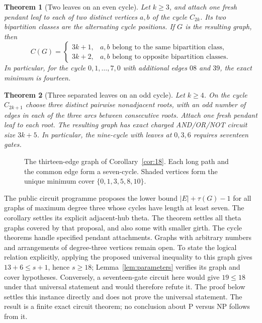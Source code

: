 \documentclass[11pt]{article}
\newtheorem{theorem}{Theorem}[section]
\theoremstyle{definition}
\theoremstyle{remark}
\begin{document}
\begin{theorem}[Two leaves on an even cycle]\label{thm:leaves}
Let $k\ge3$, and attach one fresh pendant leaf to each of two distinct
vertices $a,b$ of the cycle $C_{2k}$. Its two bipartition classes are the
alternating cycle positions. If $G$ is the resulting graph, then
\[
C(G)=
\begin{cases}
3k+1,&a,b\text{ belong to the same bipartition class},\\
3k+2,&a,b\text{ belong to opposite bipartition classes}.
\end{cases}
\]
In particular, for the cycle $0,1,\ldots,7,0$ with additional edges
$08$ and $39$, the exact minimum is fourteen.
\end{theorem}

\begin{theorem}[Three separated leaves on an odd cycle]\label{thm:threeleaves}
Let $k\ge4$. On the cycle $C_{2k+1}$ choose three distinct pairwise
nonadjacent roots, with an odd number of edges in each of the three arcs
between consecutive roots. Attach one fresh pendant leaf to each root.
The resulting graph has exact charged AND/OR/NOT circuit size $3k+5$.
In particular, the nine-cycle with leaves at $0,3,6$ requires seventeen gates.
\end{theorem}

\begin{figure}[ht]
\centering

\caption{The thirteen-edge graph of Corollary~\ref{cor:18}. Each long path
and the common edge form a seven-cycle. Shaded vertices form the unique
minimum cover $\{0,1,3,5,8,10\}$.}
\label{fig:theta}
\end{figure}

The public circuit programme proposes the lower bound $|E|+\tau(G)-1$ for
all graphs of maximum degree three whose cycles have length at least seven\cite{proposal}. The corollary
settles its explicit adjacent-hub theta. The theorem settles all theta
graphs covered by that proposal, and also some with smaller girth.
The cycle theorems handle specified pendant attachments. Graphs with
arbitrary numbers and arrangements of degree-three vertices remain open.
To state the logical relation explicitly, applying the proposed universal
inequality to this graph gives $13+6\le s+1$, hence $s\ge18$;
Lemma~\ref{lem:parameters} verifies its graph and cover hypotheses.
Conversely, a seventeen-gate circuit here would give $19\le18$ under that
universal statement and would therefore refute it. The proof below settles
this instance directly and does not prove the universal statement.
The result is a finite exact circuit theorem; no conclusion about
P versus NP follows from it.
\end{document}
